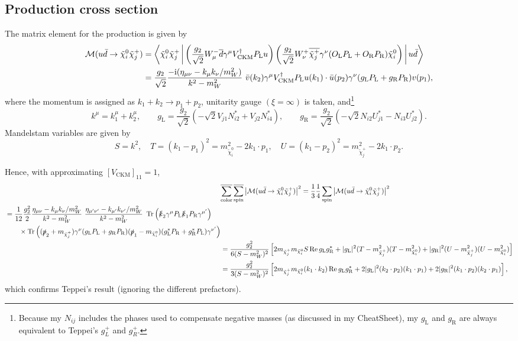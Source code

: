 \documentclass[a4paper,10pt,captions=tableheading,DIV=14]{scrartcl}
\numberwithin{equation}{section}
\newcommand\w[1]{_{\mathrm{#1}}}
\newcommand\ii{\mathrm{i}}
\DeclareMathOperator{\Tr}{\mathrm{Tr}}
\renewcommand{\Re}{\mathop{\mathrm{Re}}}
\newcommand\neut  [1][\relax]{{\tilde\chi^0_{#1}}}
\newcommand\charP [1][\relax]{{\tilde\chi^+_{#1}}}
\newcommand{\gL}{g\w L}
\newcommand{\gR}{g\w R}
\newcommand{\PL}{P\w L}
\newcommand{\PR}{P\w R}
\begin{document}
\subsection{Production cross section}\label{sec:prod-cross-sect}
The matrix element for the production is given by
\begin{align}
 \mathcal M(u\bar d\to\neut[i]\charP[j])
&=
\Braket{\neut[i]\charP[j]|
\left(\frac{g_2}{\sqrt2}W_\mu^- \overline d\gamma^\mu V^\dagger\w{CKM}\PL u\right)
\left(\frac{g_2}{\sqrt2}W_\nu^+ \overline{\charP[j]}\gamma^\nu(O\w L\PL+O\w R\PR)\neut[i]\right)|
u\bar d
}
\\&=
\frac{g_2}{\sqrt2}\frac{-\ii(\eta_{\mu\nu}-k_\mu k_\nu/m_W^2)}{k^2-m_W^2}\
\bar v(k_2) \gamma^\mu V^\dagger\w{CKM}\PL u(k_1)\cdot
\bar u(p_2)\gamma^\nu(\gL\PL+\gR\PR)v(p_1),
\end{align}
where the momentum is assigned as $k_1+k_2\to p_1+p_2$, unitarity gauge $(\xi=\infty)$ is taken, and\footnote{%
  Because my $N_{ij}$ includes the phases used to compensate negative masses (as discussed in my CheatSheet), my $\gL$ and $\gR$ are always equivalent to Teppei's $g_L^+$ and $g_R^+$.
}
\begin{equation}
 k^\mu=k_1^\mu+k_2^\mu,\qquad
 \gL = \frac{g_2}{\sqrt2}\left(-{\sqrt2}V_{j1}N_{i2}^* + V_{j2}N^*_{i4}\right),\qquad
 \gR = \frac{g_2}{\sqrt2}\left(-{\sqrt2}N_{i2}U_{j1}^* - N_{i3}U_{j2}^*\right).
\end{equation}
Mandelstam variables are given by
\begin{equation}
  S= k^2,\quad
  T=(k_1-p_1)^2=m_{\neut[i]}^2-2k_1\cdot p_1,\quad
  U=(k_1-p_2)^2=m_{\charP[j]}^2-2k_1\cdot p_2.
\end{equation}

Hence, with approximating $[V\w{CKM}]_{11}=1$,
\begin{align}
&\overline{\sum\w{color}}\,\overline{\sum\w{spin}}\left|\mathcal M(u\bar d\to\neut[i]\charP[j])\right|^2\notag
=\frac13\frac14\sum\w{spin}\left|\mathcal M(u\bar d\to\neut[i]\charP[j])\right|^2\notag\\
\begin{split}
 &=\frac{1}{12}
 \frac{g_2^2}{2}
 \frac{\eta_{\mu\nu}-k_\mu k_\nu/m_W^2}{k^2-m_W^2}\
 \frac{\eta_{\mu'\nu'}-k_{\mu'}k_{\nu'}/m_W^2}{k^2-m_W^2}\
 \Tr\left(\slashed k_2\gamma^\mu \PL \slashed k_1 \PR\gamma^{\mu'}\right)
 \\&\qquad\times
 \Tr\left(
 (\slashed p_2+m_{\charP[j]})\gamma^\nu(\gL\PL+\gR\PR)(\slashed p_1-m_{\neut[i]})
 (\gL^*\PR + \gR^*\PL)\gamma^{\nu'}
 \right)
\end{split}
\\&=
\frac{g_2^2}{6(S-m_W^2)^2}\left[
2m_{\charP[j]} m_{\neut[i]} S \Re\gL\gR^*+
   |\gL|^2(T-m_{\charP[j]}^2)(T-m_{\neut[i]}^2)+
   |\gR|^2(U-m_{\charP[j]}^2)(U-m_{\neut[i]}^2)
\right]
\\&=
\frac{g_2^2}{3(S-m_W^2)^2}\left[
2m_{\charP[j]} m_{\neut[i]} (k_1\cdot k_2) \Re\gL\gR^*
   +2|\gL|^2(k_2\cdot p_2)(k_1\cdot p_1)
   +2|\gR|^2(k_1\cdot p_2)(k_2\cdot p_1)
\right],
\end{align}
which confirms Teppei's result (ignoring the different prefactors).
\end{document}
